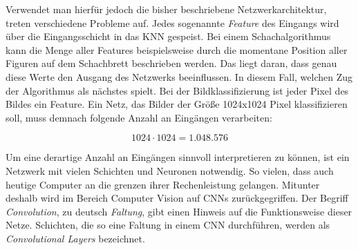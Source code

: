 Verwendet man hierfür jedoch die bisher beschriebene Netzwerkarchitektur, treten verschiedene Probleme auf. Jedes sogenannte \emph{Feature} des Eingangs wird über die Eingangsschicht in das \ac{KNN} gespeist. Bei einem Schachalgorithmus kann die Menge aller Features beispielsweise durch die momentane Position aller Figuren auf dem Schachbrett beschrieben werden. Das liegt daran, dass genau diese Werte den Ausgang des Netzwerks beeinflussen. In diesem Fall, welchen Zug der Algorithmus als nächstes spielt. Bei der Bildklassifizierung ist jeder Pixel des Bildes ein Feature. Ein Netz, das Bilder der Größe 1024x1024 Pixel klassifizieren soll, muss demnach folgende Anzahl an Eingängen verarbeiten:

\begin{equation}
   1024 \cdot 1024 = 1.048.576
\end{equation}

Um eine derartige Anzahl an Eingängen sinnvoll interpretieren zu können, ist ein Netzwerk mit vielen Schichten und Neuronen notwendig. So vielen, dass auch heutige Computer an die grenzen ihrer Rechenleistung gelangen. Mitunter deshalb wird im Bereich Computer Vision auf \acp{CNN} zurückgegriffen. Der Begriff \emph{Convolution}, zu deutsch \emph{Faltung}, gibt einen Hinweis auf die Funktionsweise dieser Netze. Schichten, die so eine Faltung in einem \ac{CNN} durchführen, werden als \emph{Convolutional Layers} bezeichnet.

